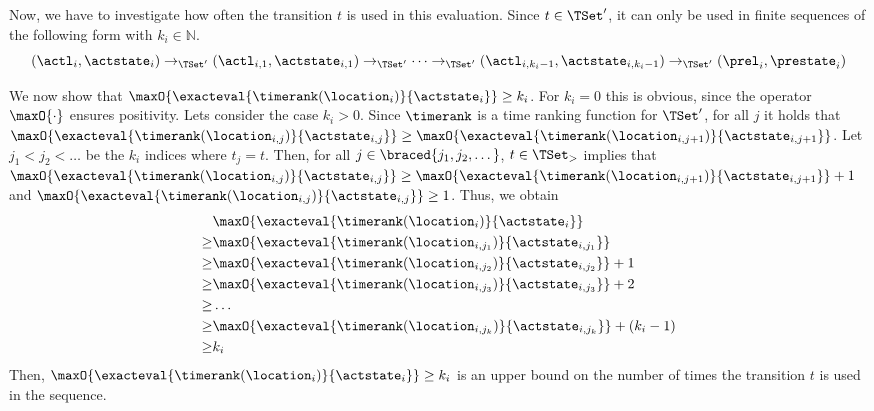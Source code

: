 Now, we have to investigate how often the transition $t$ is used in this evaluation.
Since $t \in \TSet'$, it can only be used in finite sequences of the following form with $k_i \in \mathbb{N}$.
\[ (\actl_i, \actstate_i) \rightarrow_{\TSet'} (\actl_{i,1}, \actstate_{i,1}) \rightarrow_{\TSet'} \dots \rightarrow_{\TSet'} (\actl_{i,k_i-1}, \actstate_{i,k_i-1}) \rightarrow_{\TSet'} (\prel_i, \prestate_i) \]

We now show that $\maxO{\exacteval{\timerank(\location_i)}{\actstate_i}} \geq k_i$.
For $k_i = 0$ this is obvious, since the operator $\maxO{\cdot}$ ensures positivity.
Lets consider the case $k_i > 0$.
Since $\timerank$ is a time ranking function for $\TSet'$, for all $j$ it holds that $\maxO{\exacteval{\timerank(\location_{i,j})}{\actstate_{i,j}}} \geq \maxO{\exacteval{\timerank(\location_{i,j+1})}{\actstate_{i,j+1}}}$.
Let $j_1 < j_2 < \dots$ be the $k_i$ indices where $t_j = t$.
Then, for all $j \in \braced{j_1, j_2, \dots}$, $t \in \TSet_>$ implies that $\maxO{\exacteval{\timerank(\location_{i,j})}{\actstate_{i,j}}} \geq \maxO{\exacteval{\timerank(\location_{i,j+1})}{\actstate_{i,j+1}}} + 1$ and $\maxO{\exacteval{\timerank(\location_{i,j})}{\actstate_{i,j}}} \geq 1$.
Thus, we obtain
\begin{align*}
  & \maxO{\exacteval{\timerank(\location_i)}{\actstate_i}} \\
  \geq & \maxO{\exacteval{\timerank(\location_{i,j_1})}{\actstate_{i,j_1}}} \\
  \geq & \maxO{\exacteval{\timerank(\location_{i,j_2})}{\actstate_{i,j_2}}} + 1 \\
  \geq & \maxO{\exacteval{\timerank(\location_{i,j_3})}{\actstate_{i,j_3}}} + 2 \\
  \geq & \dots \\
  \geq & \maxO{\exacteval{\timerank(\location_{i,j_k})}{\actstate_{i,j_k}}} + (k_i-1) \\
  \geq & k_i
\end{align*}
Then, $\maxO{\exacteval{\timerank(\location_i)}{\actstate_i}} \geq k_i$ is an upper bound on the number of times the transition $t$ is used in the sequence.

